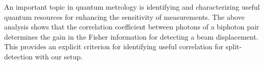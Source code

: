 An important topic in quantum metrology is identifying and characterizing useful quantum resources for enhancing the sensitivity of measurements. The above analysis shows that the correlation coefficient between photons of a biphoton pair determines the gain in the Fisher information for detecting a beam displacement. This provides an explicit criterion for identifying useful correlation for split-detection with our setup.
 


